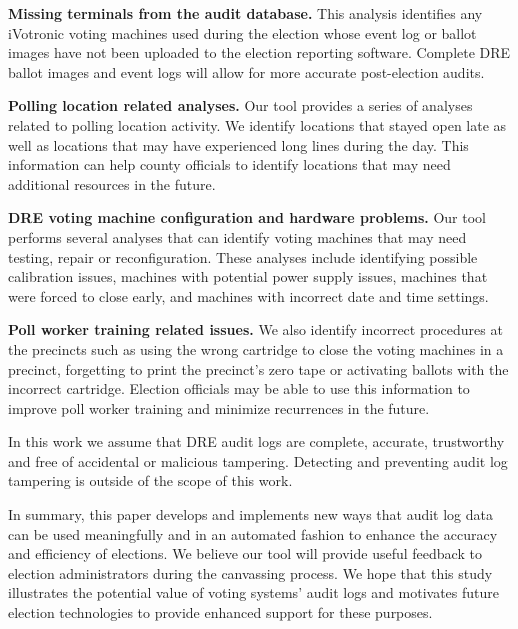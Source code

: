 \textbf{Missing terminals from the audit database.} This analysis identifies any iVotronic voting machines used during the election whose event log or ballot images have not been uploaded to the election reporting software. Complete DRE ballot images and event logs will allow for more accurate post-election audits.

\textbf{Polling location related analyses.} Our tool provides a series of analyses related to polling location activity. We identify locations that stayed open late as well as locations that may have experienced long lines during the day. This information can help county officials to identify locations that may need additional resources in the future. 

\textbf{DRE voting machine configuration and hardware problems.} Our tool performs several analyses that can identify  voting machines that may need testing, repair or reconfiguration. These analyses include identifying possible calibration issues, machines with potential power supply issues, machines that were forced to close early, and machines with incorrect date and time settings.

\textbf{Poll worker training related issues.} We also identify incorrect procedures at the precincts such as using the wrong cartridge to close the voting machines in a precinct, forgetting to print the precinct's zero tape or activating ballots with the incorrect cartridge. Election officials may be able to use this information to improve poll worker training and minimize recurrences in the future.

In this work we assume that DRE audit logs are complete, accurate,  trustworthy and free of accidental or malicious tampering. Detecting and preventing audit log tampering is outside of the scope of this work.

In summary, this paper develops and implements new ways that audit log data can be used meaningfully and in an automated fashion to enhance the accuracy and efficiency of elections. We believe our tool will provide useful feedback to election administrators during the canvassing process. We hope that this study illustrates the potential value of voting systems' audit logs and motivates future election technologies to provide enhanced support for these purposes.

